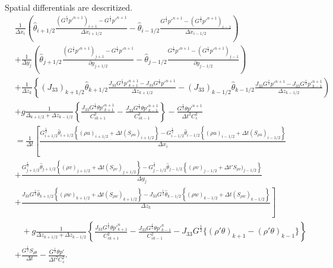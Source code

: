 Spatial differentials are descritized.
\begin{align}
  & \frac{1}{\Delta x_i}\left(
   \hat{\theta}_{i+1/2}\frac{(G^{\frac{1}{2}}p'^{n+1})_{i+1}-G^{\frac{1}{2}}p'^{n+1}}{\Delta x_{i+1/2}}
  -\hat{\theta}_{i-1/2}\frac{G^{\frac{1}{2}}p'^{n+1}-(G^{\frac{1}{2}}p'^{n+1})_{i-1}}{\Delta x_{i-1/2}}
  \right) \nonumber\\&
  + \frac{1}{\Delta y_j}\left(
   \hat{\theta}_{j+1/2}\frac{(G^{\frac{1}{2}}p'^{n+1})_{j+1}-G^{\frac{1}{2}}p'^{n+1}}{\partial y_{j+1/2}}
  -\hat{\theta}_{j-1/2}\frac{G^{\frac{1}{2}}p'^{n+1}-(G^{\frac{1}{2}}p'^{n+1})_{j-1}}{\partial y_{j-1/2}}
 \right) \nonumber\\&
  + \frac{1}{\Delta z_k}\left\{
   (J_{33})_{k+1/2}\hat{\theta}_{k+1/2}\frac{J_{33}G^{\frac{1}{2}}p'^{n+1}_{k+1}-J_{33}G^{\frac{1}{2}}p'^{n+1}}{\Delta z_{k+1/2}}
  -(J_{33})_{k-1/2}\hat{\theta}_{k-1/2}\frac{J_{33}G^{\frac{1}{2}}p'^{n+1}-J_{33}G^{\frac{1}{2}}p'^{n+1}_{k-1}}{\Delta z_{k-1/2}}
  \right) \nonumber\\&
  + g \frac{1}{\Delta_{k+1/2}+\Delta z_{k-1/2}} \left\{
   \frac{J_{33}G^{\frac{1}{2}}\theta p'^{n+1}_{k+1}}{C^2_{s k+1}}
  -\frac{J_{33}G^{\frac{1}{2}}\theta p'^{n+1}_{k-1}}{C^2_{s k-1}} \right\}
  - \frac{G^{\frac{1}{2}}\theta p'^{n+1}}{\Delta t^2 C^2_s} \nonumber\\
  &=
  \frac{1}{\Delta t}\left[
      \frac{
         G^{\frac{1}{2}}_{i+1/2}\hat{\theta}_{i+1/2}\left\{(\rho u)_{i+1/2} + \Delta t (S_{\rho u})_{i+1/2}\right\}
        -G^{\frac{1}{2}}_{i-1/2}\hat{\theta}_{i-1/2}\left\{(\rho u)_{i-1/2} + \Delta t (S_{\rho u})_{i-1/2}\right\}
      }{\Delta x_i} \right.\nonumber\\&
    + \frac{
        G^{\frac{1}{2}}_{j+1/2}\hat{\theta}_{j+1/2}\left\{(\rho v)_{j+1/2} + \Delta t (S_{\rho v})_{j+1/2}\right\}
       -G^{\frac{1}{2}}_{j-1/2}\hat{\theta}_{j-1/2}\left\{(\rho v)_{j-1/2} + \Delta t 'S_{\rho v})_{j-1/2}\right\}
      }{\Delta y_j} \nonumber\\& \left.
    + \frac{
        J_{33}G^{\frac{1}{2}}\hat{\theta}_{k+1/2}\left\{(\rho w)_{k+1/2} + \Delta t (S_{\rho w})_{k+1/2}\right\}
       -J_{33}G^{\frac{1}{2}}\hat{\theta}_{k-1/2}\left\{(\rho w)_{k-1/2} + \Delta t (S_{\rho w})_{k-1/2}\right\}
      }{\Delta z_k}
    \right] \nonumber\\&\;\;\;
  + g \frac{1}{\Delta z_{k+1/2}+\Delta z_{k-1/2}}\left\{
    \frac{J_{33}G^{\frac{1}{2}}\theta p'^n_{k+1}}{C^2_{s k+1}}
   -\frac{J_{33}G^{\frac{1}{2}}\theta p'^n_{k-1}}{C^2_{s k-1}}
   - J_{33}G^{\frac{1}{2}} \{(\rho'\theta)_{k+1} - (\rho'\theta)_{k-1}\}
  \right\} \nonumber\\&
  + \frac{G^{\frac{1}{2}} S_{\rho\theta}}{\Delta t}
  - \frac{G^{\frac{1}{2}}\theta p'}{\Delta t^2 C^2_s}.
\end{align}
